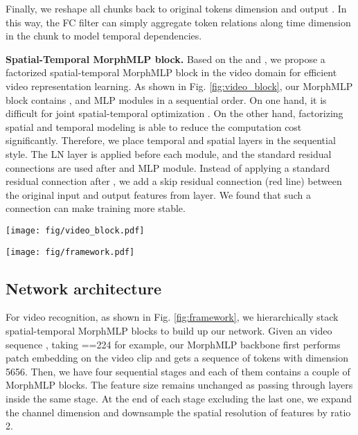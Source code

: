 \documentclass[runningheads]{llncs}
\begin{document}
Finally, we reshape all chunks  back to original tokens  dimension and output . In this way, the FC filter can  simply aggregate token relations along time dimension in the chunk to model temporal dependencies.




 
\noindent\textbf{Spatial-Temporal MorphMLP block.}
Based on the   and  , we propose a factorized spatial-temporal  MorphMLP block in the video domain for efficient video representation learning. As shown in Fig. \ref{fig:video_block}, our MorphMLP block contains ,  and MLP \cite{transformer} modules in a sequential order.  
On one hand,
it is difficult for joint spatial-temporal optimization \cite{timesformer}.
On the other hand, factorizing spatial and temporal modeling is able to reduce the computation cost significantly. Therefore,
we place temporal and spatial  layers in the sequential style.
The LN \cite{ln} layer is applied before each module, and the standard residual connections are used after  and MLP module.
Instead of applying a standard residual connection \cite{resnet} after ,
we add a skip residual connection (red line) between the original input and output features from  layer. We found that such a connection can make training more stable.


\begin{figure*}[t]
    \begin{center}
        \texttt{[image: fig/video\_block.pdf]}
        \end{center}
      
        \caption{
        Spatial-Temporal MorphMLP  Block.
        }
 
    \label{fig:video_block}
\end{figure*}



\begin{figure*}[t]
    \begin{center}
        \texttt{[image: fig/framework.pdf]}
        \end{center}
     
        \caption{
Architecture of our MorphMLP  means chuck length.}

    \label{fig:framework}
\end{figure*}
\noindent
\subsection{Network architecture}
For video recognition, as shown in Fig. \ref{fig:framework}, we hierarchically stack spatial-temporal MorphMLP blocks  to build up our network. Given an video sequence , taking ==224 for example, our MorphMLP backbone first performs patch embedding  on the video clip and gets a sequence of tokens with dimension  5656. Then, we have four sequential stages and each of them contains a couple of MorphMLP blocks. The feature size remains unchanged as passing through layers inside the same stage. At the end of each stage excluding the last one, we expand the channel dimension and downsample the spatial resolution of features by ratio 2.
\end{document}
